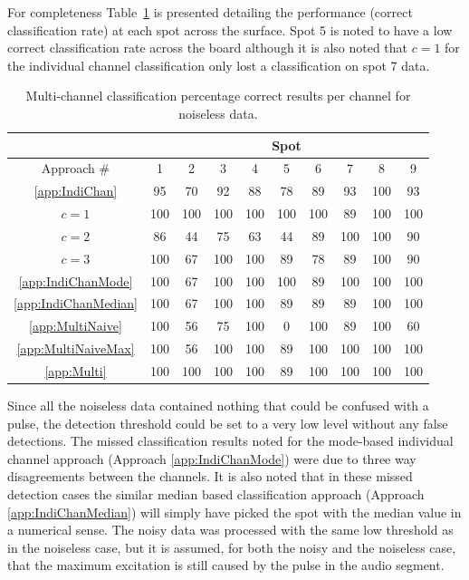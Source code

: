 For completeness Table~\ref{tab:multiAPRresultsPerChan} is presented detailing the performance (correct classification rate) at each spot across the surface. Spot 5 is noted to have a low correct classification rate across the board although it is also noted that $c = 1$ for the individual channel classification only lost a classification on spot 7 data. 

\begin{table}\begin{center}
\caption{Multi-channel classification percentage correct results per channel for noiseless data.}
\label{tab:multiAPRresultsPerChan}
\begin{tabular}{|c|c|c|c|c|c|c|c|c|c|}\hline
  & \multicolumn{9}{|c|}{Spot} \\
\hline 
Approach \#             & 1   & 2   & 3   & 4   & 5   & 6   & 7    & 8    & 9  \\ \hline \ref{app:IndiChan}      & 95  & 70  & 92  & 88  & 78  & 89  &  93  & 100  & 93   \\
$c = 1$                 & 100 & 100 & 100 & 100 & 100 & 100 &   89 &  100 & 100  \\
$c = 2$                 & 86  & 44  & 75  & 63  & 44  & 89  & 100  & 100  & 90   \\
$c = 3$                 & 100 &  67 & 100 & 100 &  89 &  78 &   89 &  100 &  90  \\
\ref{app:IndiChanMode}  & 100 &  67 & 100 & 100 & 100 &  89 &  100 &  100 & 100  \\
\ref{app:IndiChanMedian}& 100 &  67 & 100 & 100 &  89 &  89 &   89 &  100 & 100  \\
\ref{app:MultiNaive}    & 100 &  56 &  75 & 100 &   0 & 100 &   89 &  100 &  60  \\
\ref{app:MultiNaiveMax} & 100 &  56 & 100 & 100 &  89 & 100 &  100 &  100 & 100  \\
\ref{app:Multi}         & 100 & 100 & 100 & 100 &  89 & 100 &  100 &  100 & 100  \\ \hline
\end{tabular}\end{center}\end{table}


Since all the noiseless data contained nothing that could be confused with a pulse, the detection threshold could be set to a very low level without any false detections. The missed classification results noted for the mode-based individual channel approach (Approach \ref{app:IndiChanMode}) were due to three way disagreements between the channels. It is also noted that in these missed detection cases the similar median based classification approach (Approach \ref{app:IndiChanMedian}) will simply have picked the spot with the median value in a numerical sense. The noisy data was processed with the same low threshold as in the noiseless case, but it is assumed, for both the noisy and the noiseless case, that the maximum excitation is still caused by the pulse in the audio segment.

